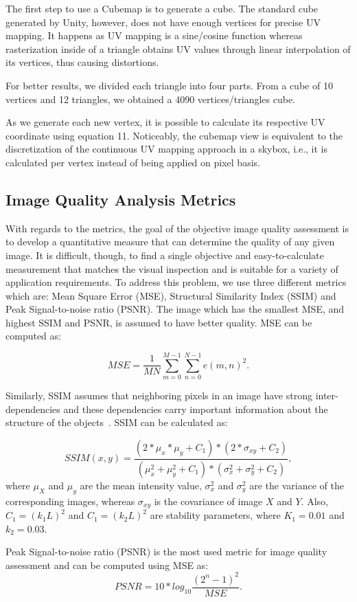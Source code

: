 \documentclass[10pt,conference,pdftex]{IEEEtran}
\begin{document}
The first step to use a Cubemap is to generate a cube. The standard cube generated by Unity, however, does not have enough vertices for precise UV mapping. It happens as UV mapping is a sine/cosine function whereas rasterization inside of a triangle obtains UV values through linear interpolation of its vertices, thus causing distortions.

For better results, we divided each triangle into four parts. From a cube of 10 vertices and 12 triangles, we obtained a 4090 vertices/triangles cube.

As we generate each new vertex, it is possible to calculate its respective UV coordinate using equation 11. Noticeably, the cubemap view is equivalent to the discretization of the continuous UV mapping approach in a skybox, i.e., it is calculated per vertex instead of being applied on pixel basis.

\subsection{Image Quality Analysis Metrics} \label{metrics}
With regards to the metrics, the goal of the objective image quality assessment is to develop a quantitative measure that can determine the quality of any given image. It is difficult, though, to find a single objective and easy-to-calculate measurement that matches the visual inspection and is suitable for a variety of application requirements. To address this problem, we use three different metrics which are:
Mean Square Error (MSE), Structural Similarity Index (SSIM) and Peak Signal-to-noise ratio (PSNR). The image which has the smallest MSE, and highest SSIM and PSNR, is assumed to have better quality. MSE can be computed as:

\begin{equation}
MSE=\frac{1}{MN}\sum_{m=0}^{M-1}{\sum_{n=0}^{N-1}{e(m,n)^2}}.
\label{eq:mse}
\end{equation}

Similarly, SSIM assumes that neighboring pixels in an image have strong inter-dependencies and these dependencies carry important information about the structure of the objects~\cite{wang2004image}. SSIM can be calculated as:

\begin{equation}
SSIM(x,y)=\frac{(2*\mu_x*\mu_y+C_1)*(2*\sigma_{xy}+C_2)}{(\mu^2_x+\mu^2_y+C_1)*(\sigma^2_x+\sigma^2_y+C_2)},
\label{eq:ssim}
\end{equation}
where $\mu_X$ and $\mu_y$ are the mean intensity value, $\sigma^2_x$ and $\sigma^2_y$ are the variance of the corresponding images, whereas $\sigma_{xy}$ is the covariance of image $X$ and $Y$. Also, $C_1=(k_1L)^2$ and $C_1=(k_2L)^2$ are stability parameters, where $K_1=0.01$ and $k_2=0.03$. \par
Peak Signal-to-noise ratio (PSNR) is the most used metric for image quality assessment and can be computed using MSE as:
\begin{equation}
PSNR = 10*log_{10}{\frac{(2^n-1)^2}{MSE}}.
\label{eq:psnr}
\end{equation}
\end{document}
